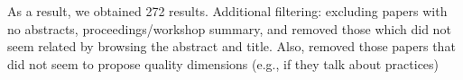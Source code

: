 As a result, we obtained 272 results. Additional filtering: excluding papers with no abstracts, proceedings/workshop summary,
and removed those which did not seem related by browsing the abstract and title. Also, removed those papers that did not seem to propose
quality dimensions (e.g., if they talk about practices)

